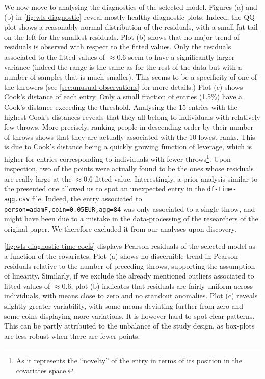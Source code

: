 \documentclass[a4paper, 12pt,oneside]{article}
\begin{document}
		We now move to analysing the diagnostics of the selected model. Figures (a) and (b) in \ref{fig:wls-diagnostic} reveal mostly healthy diagnostic plots. Indeed, the QQ plot shows a reasonably normal distribution of the residuals, with a small fat tail on the left for the smallest residuals. Plot (b) shows that no major trend of residuals is observed with respect to the fitted values. Only the residuals associated to the fitted values of $\approx 0.6$ seem to have a significantly larger variance (indeed the range is the same as for the rest of the data but with a number of samples that is much smaller). This seems to be a specificity of one of the throwers (see \ref{sec:unusual-observations} for more details.)
		Plot (c) shows Cook's distance of each entry. Only a small fraction of entries (1.5\%) have a Cook's distance exceeding the threshold. Analysing the 15 entries with the highest Cook's distances reveals that they all belong to individuals with relatively few throws. More precisely, ranking people in descending order by their number of throws shows that they are actually associated with the 10 lowest-ranks. This is due to Cook's distance being a quickly growing function of leverage, which is higher for entries corresponding to individuals with fewer throws\footnote{As it represents the ``novelty'' of the entry in terms of its position in the covariates space.}. Upon inspection, two of the points were actually found to be the ones whose residuals are really large at the $\approx 0.6$ fitted value.
		Interestingly, a prior analysis similar to the presented one allowed us to spot an unexpected entry in the \texttt{df-time-agg.csv} file. Indeed, the entry associated to \texttt{person=adamF,coin=0.05EUR,agg=84} was only associated to a single throw, and might have been due to a mistake in the data-processing of the researchers of the original paper. We therefore excluded it from our analyses upon discovery. 

		\ref{fig:wls-diagnostic-time-coefs} displays Pearson residuals of the selected model as a function of the covariates.
		Plot (a) shows no discernible trend in Pearson residuals relative to the number of preceding throws, supporting the assumption of linearity.
		Similarly, if we exclude the already mentioned outliers associated to fitted values of $\approx 0.6$, plot (b) indicates that residuals are fairly uniform across individuals, with means close to zero and no standout anomalies. Plot (c) reveals slightly greater variability, with some means deviating further from zero and some coins displaying more variations. It is however hard to spot clear patterns. This can be partly attributed to the unbalance of the study design, as box-plots are less robust when there are fewer points.
\end{document}
